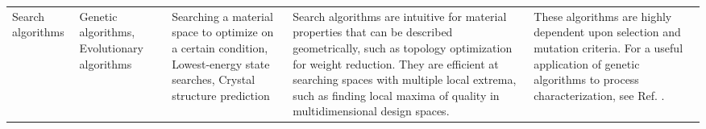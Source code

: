 \begin{table*}[t]
\begin{tabular}{p{2.25cm}|p{2.25cm}|p{3cm}|p{4cm}|p{4cm}}
Search algorithms & \raggedright Genetic algorithms, Evolutionary algorithms & Searching a material space to optimize on a certain condition, Lowest-energy state searches, Crystal structure prediction &  \raggedright Search algorithms are intuitive for material properties that can be described geometrically, such as topology optimization for weight reduction. They are efficient at searching spaces with multiple local extrema, such as finding local maxima of quality in multidimensional design spaces. &  These algorithms are highly dependent upon selection and mutation criteria. For a useful application of genetic algorithms to process characterization, see Ref. \cite{Grefenstette1986}. \\ 

\end{tabular}
\end{table*}